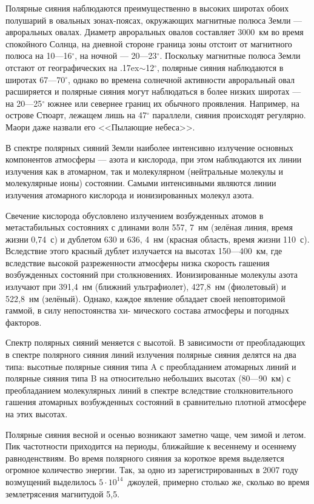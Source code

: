\documentclass[a4paper,14pt]{article}
\newcommand{\tilda}{\raise.17ex\hbox{$\scriptstyle\sim$}}
\begin{document}
Полярные сияния наблюдаются преимущественно в высоких широтах обоих полушарий в овальных зонах-поясах, окружающих магнитные полюса Земли — авроральных овалах. Диаметр авроральных овалов составляет 3000~км во время спокойного Солнца, на дневной стороне граница зоны отстоит от магнитного полюса на 10—16$^\circ$, на ночной — 20—23$^\circ$. Поскольку магнитные полюса Земли отстают от географических на \tilda12$^\circ$, полярные сияния наблюдаются в широтах 67—70$^\circ$, однако во времена солнечной активности авроральный овал расширяется и полярные сияния могут наблюдаться в более низких широтах — на 20—25$^\circ$ южнее или севернее границ их обычного проявления. Например, на острове Стюарт, лежащем лишь на 47$^\circ$ параллели, сияния происходят регулярно. Маори даже назвали его <<Пылающие небеса>>.

В спектре полярных сияний Земли наиболее интенсивно излучение основных компонентов атмосферы — азота и кислорода, при этом наблюдаются их линии излучения как в атомарном, так и молекулярном (нейтральные молекулы и молекулярные ионы) состоянии. Самыми интенсивными являются линии излучения атомарного кислорода и ионизированных молекул азота.

Свечение кислорода обусловлено излучением возбужденных атомов в метастабильных состояниях с длинами волн 557, 7~нм (зелёная линия, время жизни 0,74~с) и дублетом 630 и 636, 4~нм (красная область, время жизни 110~с). Вследствие этого красный дублет излучается на высотах 150—400~км, где вследствие высокой разреженности атмосферы низка скорость гашения возбужденных состояний при столкновениях. Ионизированные молекулы азота излучают при 391,4~нм (ближний ультрафиолет), 427,8~нм (фиолетовый) и 522,8~нм (зелёный). Однако, каждое явление обладает своей неповторимой гаммой, в силу непостоянства хи-
мического состава атмосферы и погодных факторов.

Спектр полярных сияний меняется с высотой. В зависимости от преобладающих в спектре полярного сияния линий излучения полярные сияния делятся на два типа: высотные полярные сияния типа A с преобладанием атомарных линий и полярные сияния типа B на относительно небольших высотах (80—90~км) с преобладанием молекулярных линий в спектре вследствие столкновительного гашения атомарных возбужденных состояний в сравнительно плотной атмосфере на этих высотах. 

Полярные сияния весной и осенью возникают заметно чаще, чем зимой и летом. Пик частотности приходится на периоды, ближайшие к весеннему и осеннему равноденствиям. Во время полярного сияния за короткое время выделяется огромное количество энергии. Так, за одно из зарегистрированных в 2007 году возмущений выделилось $5\cdot10^{14}$~джоулей, примерно столько же, сколько во время землетрясения магнитудой 5,5.
\end{document}
